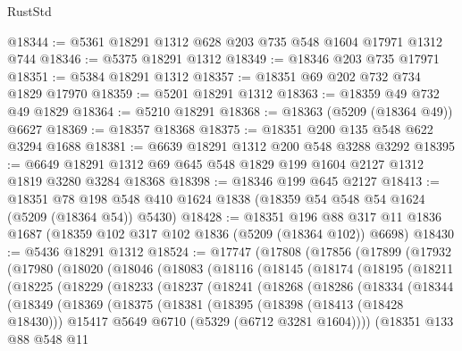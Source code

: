 \begin{lexlean}{RustStd}
\begin{coremodule}
@18344 := @5361 @18291 @1312 @628 @203 @735 @548 @1604 @17971 @1312 @744
@18346 := @5375 @18291 @1312
@18349 := @18346 @203 @735 @17971
@18351 := @5384 @18291 @1312
@18357 := @18351 @69 @202 @732 @734 @1829 @17970
@18359 := @5201 @18291 @1312
@18363 := @18359 @49 @732 @49 @1829
@18364 := @5210 @18291
@18368 := @18363 (@5209 (@18364 @49)) @6627
@18369 := @18357 @18368
@18375 := @18351 @200 @135 @548 @622 @3294 @1688
@18381 := @6639 @18291 @1312 @200 @548 @3288 @3292
@18395 := @6649 @18291 @1312 @69 @645 @548 @1829 @199 @1604 @2127 @1312 @1819 @3280 @3284 @18368
@18398 := @18346 @199 @645 @2127
@18413 := @18351
    @78
    @198
    @548
    @410
    @1624
    @1838
    (@18359 @54 @548 @54 @1624 (@5209 (@18364 @54)) @5430)
@18428 := @18351
    @196
    @88
    @317
    @11
    @1836
    @1687
    (@18359 @102 @317 @102 @1836 (@5209 (@18364 @102)) @6698)
@18430 := @5436 @18291 @1312
@18524 := @17747
    (@17808
      (@17856
        (@17899
          (@17932
            (@17980
              (@18020
                (@18046
                  (@18083
                    (@18116
                      (@18145
                        (@18174
                          (@18195
                            (@18211
                              (@18225
                                (@18229
                                  (@18233
                                    (@18237
                                      (@18241
                                        (@18268
                                          (@18286
                                            (@18334
                                              (@18344
                                                (@18349
                                                  (@18369
                                                    (@18375
                                                      (@18381
                                                        (@18395
                                                          (@18398 (@18413 (@18428 @18430)))
                                                          @15417
                                                          @5649
                                                          @6710
                                                          (@5329 (@6712 @3281 @1604))))
                                                      (@18351
                                                        @133
                                                        @88
                                                        @548
                                                        @11

\end{coremodule}
\end{lexlean}
